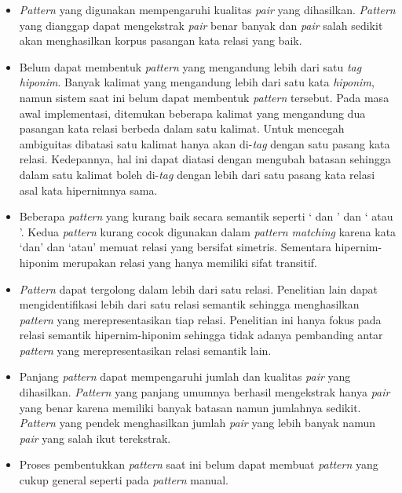 \begin{itemize}
  \item \textit{Pattern} yang digunakan mempengaruhi kualitas \textit{pair} yang dihasilkan. \textit{Pattern} yang dianggap dapat mengekstrak \textit{pair} benar banyak dan \textit{pair} salah sedikit akan menghasilkan korpus pasangan kata relasi yang baik.
  \item Belum dapat membentuk \textit{pattern} yang mengandung lebih dari satu \textit{tag hiponim}. Banyak kalimat yang mengandung lebih dari satu kata \textit{hiponim}, namun sistem saat ini belum dapat membentuk \textit{pattern} tersebut. Pada masa awal implementasi, ditemukan beberapa kalimat yang mengandung dua pasangan kata relasi berbeda dalam satu kalimat. Untuk mencegah ambiguitas dibatasi satu kalimat hanya akan di-\textit{tag} dengan satu pasang kata relasi. Kedepannya, hal ini dapat diatasi dengan mengubah batasan sehingga dalam satu kalimat boleh di-\textit{tag} dengan lebih dari satu pasang kata relasi asal kata hipernimnya sama. 
  \item Beberapa \textit{pattern} yang kurang baik secara semantik seperti `{\tagHypernym} dan {\tagHyponym}' dan  `{\tagHypernym} atau {\tagHyponym}'. Kedua \textit{pattern} kurang cocok digunakan dalam \textit{pattern matching} karena kata `dan' dan `atau' memuat relasi yang bersifat simetris. Sementara hipernim-hiponim merupakan relasi yang hanya memiliki sifat transitif.
  \item \textit{Pattern} dapat tergolong dalam lebih dari satu relasi.   Penelitian lain dapat mengidentifikasi lebih dari satu relasi semantik sehingga menghasilkan \textit{pattern} yang merepresentasikan tiap relasi. Penelitian ini hanya fokus pada relasi semantik hipernim-hiponim sehingga tidak adanya pembanding antar \textit{pattern} yang merepresentasikan relasi semantik lain.
  \item Panjang \textit{pattern} dapat mempengaruhi jumlah dan kualitas \textit{pair} yang dihasilkan. \textit{Pattern} yang panjang umumnya berhasil mengekstrak hanya \textit{pair} yang benar karena memiliki banyak batasan namun jumlahnya sedikit. \textit{Pattern} yang pendek menghasilkan jumlah \textit{pair} yang lebih banyak namun \textit{pair} yang salah ikut terekstrak.
  \item Proses pembentukkan \textit{pattern} saat ini belum dapat membuat \textit{pattern} yang cukup general seperti pada \textit{pattern} manual.

\end{itemize}
